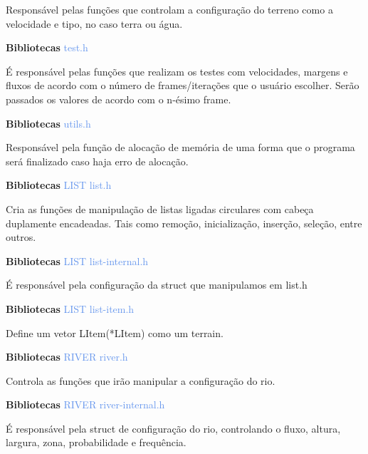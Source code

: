 \documentclass[a4paper,12pt]{article}
\begin{document}
Responsável pelas funções que controlam a configuração do terreno como a velocidade e tipo, no caso terra ou água.
\bigskip
\bigskip
\bigskip

{\Large \textcolor{NavyBlue}{ \textbf{Bibliotecas  }}}{\large \textcolor{CornflowerBlue}{  test.h}}
\bigskip

É responsável pelas funções que realizam os testes com velocidades, margens e fluxos de acordo com o número de frames/iterações que o usuário escolher.
Serão passados os valores de acordo com o n-ésimo frame.

\bigskip
\bigskip
\bigskip

{\Large \textcolor{NavyBlue}{ \textbf{Bibliotecas  }}}{\large \textcolor{CornflowerBlue}{  utils.h}}
\bigskip

Responsável pela função de alocação de memória de uma forma que o programa será finalizado caso haja erro de alocação.


\newpage %

{\Large \textcolor{NavyBlue}{ \textbf{Bibliotecas  }}}{\large \textcolor{CornflowerBlue}{  LIST  list.h}}
\bigskip

Cria as funções de manipulação de listas ligadas circulares com cabeça duplamente encadeadas. Tais como remoção, inicialização, inserção, seleção, entre outros.
\bigskip
\bigskip
\bigskip

{\Large \textcolor{NavyBlue}{ \textbf{Bibliotecas  }}}{\large \textcolor{CornflowerBlue}{  LIST  list-internal.h}}
\bigskip

É responsável pela configuração da struct que manipulamos em list.h
\bigskip
\bigskip
\bigskip

{\Large \textcolor{NavyBlue}{ \textbf{Bibliotecas  }}}{\large \textcolor{CornflowerBlue}{  LIST  list-item.h}}
\bigskip

Define um vetor LItem(*LItem) como um terrain.
\bigskip
\bigskip
\bigskip

{\Large \textcolor{NavyBlue}{ \textbf{Bibliotecas  }}}{\large \textcolor{CornflowerBlue}{  RIVER  river.h}}
\bigskip

Controla as funções que irão manipular a configuração do rio.
\bigskip
\bigskip
\bigskip

{\Large \textcolor{NavyBlue}{ \textbf{Bibliotecas  }}}{\large \textcolor{CornflowerBlue}{  RIVER  river-internal.h}}
\bigskip

É responsável pela struct de configuração do rio, controlando o fluxo, altura, largura, zona, probabilidade e frequência.
\end{document}
